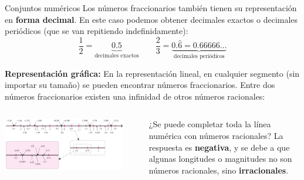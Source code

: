 \documentclass[9pt, aspectratio=169]{beamer}
\begin{document}
\begin{frame}{Conjuntos numéricos}
    Los números fraccionarios también tienen su representación en \textbf{forma decimal}. En este caso podemos obtener decimales exactos o decimales periódicos (que se van repitiendo indefinidamente):
    \[ \frac{1}{2} = \underbrace{0.5}_{\text{decimales exactos}} \qquad \frac{2}{3} = \underbrace{0.\hat{6} = 0.66666\ldots}_{\text{decimales periódicos}} \]
\pause

\textbf{Representación gráfica:} En la representación lineal, en cualquier segmento (sin importar su tamaño) se pueden encontrar números fraccionarios. Entre dos números fraccionarios existen una infinidad de otros números racionales:
\begin{columns}[c]
\begin{center}
    \includegraphics[width=0.90\textwidth]{figs/racionales.png}
\end{center}
\pause
{}
¿Se puede completar toda la línea numérica con números racionales? La respuesta es \textbf{negativa}, y se debe a que algunas longitudes o magnitudes no son números racionales, sino \textbf{irracionales}.
\end{columns}
\end{frame}
\end{document}
